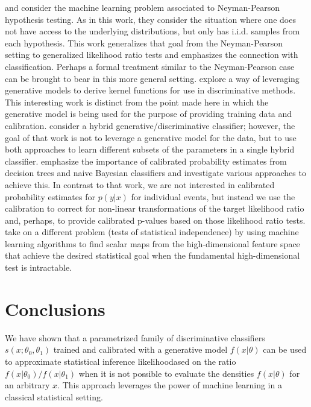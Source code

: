 \documentclass[11pt, oneside]{article}   	%
\begin{document}
\cite{ClaytonScott} and \cite{JMLR:v14:tong13a} consider the machine learning problem associated to Neyman-Pearson hypothesis testing. As in this work, they consider the situation where one does not have access to the underlying distributions, but only has i.i.d. samples from each hypothesis. This work generalizes that goal from the Neyman-Pearson setting to generalized likelihood ratio tests and emphasizes the connection with classification. Perhaps a  formal treatment similar to the Neyman-Pearson case can be brought to bear in this more general setting.
\cite{TommiJaakkola} explore a way of leveraging generative models to derive kernel functions for use in discriminative methods. This interesting work is distinct from the point made here in which the generative model is being used for the purpose of providing training data and calibration.  \cite{McCallum}
 consider a hybrid generative/discriminative classifier; however, the goal of that work is not to leverage a generative model for the data, but to use both approaches to learn different subsets of the parameters in a single hybrid classifier.  \cite{BiancaZadrozny} emphasize the importance of calibrated probability estimates from decision trees and naive Bayesian classifiers and investigate various approaches to achieve this. In contrast to that work, we are not interested in calibrated probability estimates for $p(y|x)$ for individual events, but instead we use the calibration to correct for non-linear transformations of the target likelihood ratio and, perhaps, to provide calibrated p-values based on those likelihood ratio tests. \cite{Ihler2004} take on a different problem (tests of statistical independence) by using machine learning algorithms to find  scalar maps from the high-dimensional feature space that achieve the desired statistical goal when the fundamental high-dimensional test is intractable.


\section{Conclusions}

We have shown that a parametrized family of discriminative classifiers $s(x; \theta_0, \theta_1)$ trained and calibrated with a generative model $f(x|\theta)$ can be used to approximate statistical inference likelihoodased on the  ratio $f(x|\theta_0)/f(x|\theta_1)$ when it is not possible to evaluate the densities $f(x|\theta)$ for an arbitrary $x$. This approach leverages the power of machine learning in a classical statistical setting.
\end{document}
